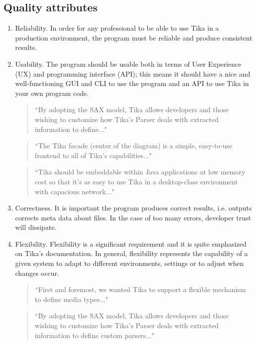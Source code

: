 \documentclass{article}
\begin{document}
\subsection{Quality attributes}
\begin{enumerate}
    \item Reliability. In order for any professional to be able to use Tika in a production environment, the program must be reliable and produce consistent results.
    \item Usability. The program should be usable both in terms of User Experience (UX) and programming interface (API); this means it should have a nice and well-functioning GUI and CLI to use the program and an API to use Tika in your own program code.
    
    \begin{quote}
        ``By adopting the SAX model, Tika allows developers and those wishing to customize how Tika’s Parser deals with extracted information to define..."
    \end{quote}
    
    \begin{quote}
        ``The Tika facade (center of the diagram) is a simple, easy-to-use frontend to all of Tika’s capabilities..."
    \end{quote}
    
    
    \begin{quote}
        ``Tika should be embeddable within Java applications at low memory cost so that it’s as easy to use Tika in a desktop-class environment with capacious network..."
    \end{quote}
    
    \item Correctness. It is important the program produces correct results, i.e. outputs corrects meta data about files. In the case of too many errors, developer trust will dissipate.
    \item Flexibility. Flexibility is a significant requirement and it is quite emphasized on Tika's documentation. In general, flexibility represents the capability of a given system to adapt to different environments, settings or to adjust when changes occur.
    
    \begin{quote}
        ``First and foremost, we wanted Tika to support a flexible mechanism to define media types..."
    \end{quote}
    
    \begin{quote}
        ``By adopting the SAX model, Tika allows developers and those wishing to customize how Tika’s Parser deals with extracted information to define custom parsers..."
    \end{quote}
    

\end{enumerate}
\end{document}
